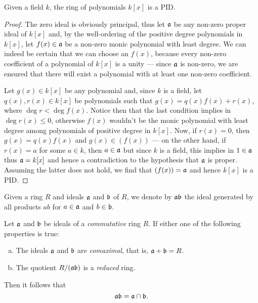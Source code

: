 \begin{proposition}
\label{prop:k[x]-is-PID}
Given a field \(k\), the ring of polynomials \(k[x]\) is a PID.
\end{proposition}

\begin{proof}
The zero ideal is obviously principal, thus let \(\mathfrak{a}\) be any non-zero
proper ideal of \(k[x]\) and, by the well-ordering of the positive degree
polynomials in \(k[x]\), let \(f(x) \in \mathfrak{a}\) be a non-zero monic
polynomial with least degree.  We can indeed be certain that we can choose an
\(f(x)\), because every non-zero coefficient of a polynomial of \(k[x]\) is a
unity --- since \(\mathfrak{a}\) is non-zero, we are ensured that there will exist
a polynomial with at least one non-zero coefficient.

Let \(g(x) \in k[x]\) be any polynomial and, since \(k\) is a field, let
\(q(x), r(x) \in k[x]\) be polynomials such that \(g(x) = q(x) f(x) + r(x)\),
where \(\deg r < \deg f(x)\). Notice then that the last condition implies in
\(\deg r(x) \leq 0\), otherwise \(f(x)\) wouldn't be the monic polynomial with
least degree among polynomials of positive degree in \(k[x]\). Now, if
\(r(x) = 0\), then \(g(x) = q(x) f(x)\) and \(g(x) \in (f(x))\) --- on the other
hand, if \(r(x) = a\) for some \(a \in k\), then \(a \in \mathfrak{a}\) but since
\(k\) is a field, this implies in \(1 \in \mathfrak{a}\) thus \(\mathfrak{a} = k[x]\)
and hence a contradiction to the hypothesis that \(\mathfrak{a}\) is
proper. Assuming the latter does not hold, we find that \((f(x)) = \mathfrak{a}\)
and hence \(k[x]\) is a PID.
\end{proof}

\begin{definition}
\label{def:product-ideal}
Given a ring \(R\) and ideals \(\mathfrak{a}\) and \(\mathfrak{b}\) of \(R\), we
denote by \(\mathfrak{a b}\) the ideal generated by all products \(a b\) for \(a
\in \mathfrak{a}\) and \(b \in \mathfrak{b}\).
\end{definition}

\begin{lemma}
\label{lem:}
Let \(\mathfrak{a}\) and \(\mathfrak{b}\) be ideals of a \emph{commutative} ring
\(R\). If either one of the following properties is true:
\begin{enumerate}[(a)]\setlength\itemsep{0em}
\item The ideals \(\mathfrak{a}\) and \(\mathfrak{b}\) are \emph{comaximal}, that is,
  \(\mathfrak{a} + \mathfrak{b} = R\).

\item The quotient \(R/(\mathfrak{a b})\) is a \emph{reduced} ring.
\end{enumerate}
Then it follows that
\[
\mathfrak{a b} = \mathfrak{a} \cap \mathfrak{b}.
\]
\end{lemma}


